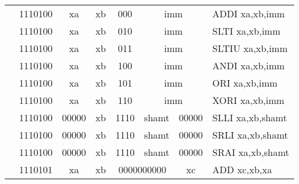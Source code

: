 \begin{table}[p]
\begin{small}
\begin{center}
\begin{tabular}{rcccccccccl}
&
\multicolumn{2}{|c|}{1110100} &
\multicolumn{1}{c|}{xa} &
\multicolumn{1}{c|}{xb} &
\multicolumn{1}{c|}{000} &
\multicolumn{4}{c|}{imm} & ADDI xa,xb,imm \\
\cline{2-10}
  

&
\multicolumn{2}{|c|}{1110100} &
\multicolumn{1}{c|}{xa} &
\multicolumn{1}{c|}{xb} &
\multicolumn{1}{c|}{010} &
\multicolumn{4}{c|}{imm} & SLTI xa,xb,imm \\
\cline{2-10}
  

&
\multicolumn{2}{|c|}{1110100} &
\multicolumn{1}{c|}{xa} &
\multicolumn{1}{c|}{xb} &
\multicolumn{1}{c|}{011} &
\multicolumn{4}{c|}{imm} & SLTIU xa,xb,imm \\
\cline{2-10}
  

&
\multicolumn{2}{|c|}{1110100} &
\multicolumn{1}{c|}{xa} &
\multicolumn{1}{c|}{xb} &
\multicolumn{1}{c|}{100} &
\multicolumn{4}{c|}{imm} & ANDI xa,xb,imm \\
\cline{2-10}
  

&
\multicolumn{2}{|c|}{1110100} &
\multicolumn{1}{c|}{xa} &
\multicolumn{1}{c|}{xb} &
\multicolumn{1}{c|}{101} &
\multicolumn{4}{c|}{imm} & ORI xa,xb,imm \\
\cline{2-10}
  

&
\multicolumn{2}{|c|}{1110100} &
\multicolumn{1}{c|}{xa} &
\multicolumn{1}{c|}{xb} &
\multicolumn{1}{c|}{110} &
\multicolumn{4}{c|}{imm} & XORI xa,xb,imm \\
\cline{2-10}
  

&
\multicolumn{2}{|c|}{1110100} &
\multicolumn{1}{c|}{00000} &
\multicolumn{1}{c|}{xb} &
\multicolumn{2}{c|}{1110} &
\multicolumn{2}{c|}{shamt} &
\multicolumn{1}{c|}{00000} & SLLI xa,xb,shamt \\
\cline{2-10}
  

&
\multicolumn{2}{|c|}{1110100} &
\multicolumn{1}{c|}{00000} &
\multicolumn{1}{c|}{xb} &
\multicolumn{2}{c|}{1110} &
\multicolumn{2}{c|}{shamt} &
\multicolumn{1}{c|}{00000} & SRLI xa,xb,shamt \\
\cline{2-10}
  

&
\multicolumn{2}{|c|}{1110100} &
\multicolumn{1}{c|}{00000} &
\multicolumn{1}{c|}{xb} &
\multicolumn{2}{c|}{1110} &
\multicolumn{2}{c|}{shamt} &
\multicolumn{1}{c|}{00000} & SRAI xa,xb,shamt \\
\cline{2-10}
  

&
\multicolumn{2}{|c|}{1110101} &
\multicolumn{1}{c|}{xa} &
\multicolumn{1}{c|}{xb} &
\multicolumn{4}{c|}{0000000000} &
\multicolumn{1}{c|}{xc} & ADD xc,xb,xa \\
\cline{2-10}
  


\end{tabular}
\end{center}
\end{small}
\end{table}
